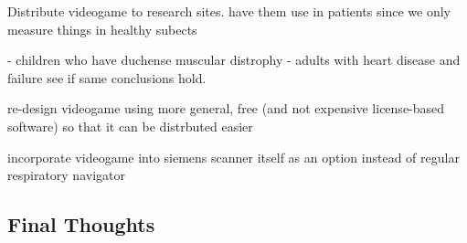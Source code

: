 	Distribute videogame to research sites. have them use in patients since we only measure things in healthy subects
	
	- children who have duchense muscular distrophy
	- adults with heart disease and failure
	see if same conclusions hold.
	
	re-design videogame using more general, free (and not expensive license-based software) so that it can be distrbuted easier
	
	incorporate videogame into siemens scanner itself as an option instead of regular respiratory navigator
	
\subsection{Final Thoughts}
	
	